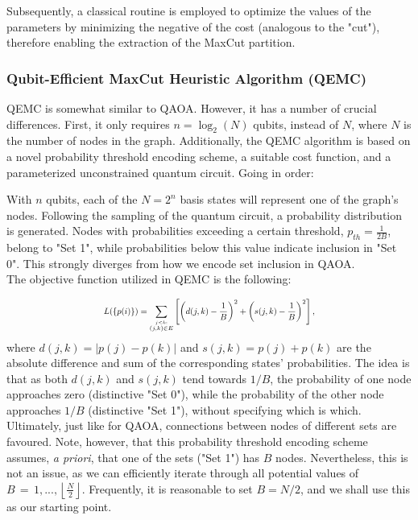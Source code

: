 Subsequently, a classical routine is employed to optimize the values of the parameters by minimizing the negative of the cost (analogous to the "cut"), therefore enabling the extraction of the MaxCut partition.

\subsubsection{Qubit-Efficient MaxCut Heuristic Algorithm (QEMC)}
\label{sec: QEMC}

QEMC \cite{tenecohen2023variational} is somewhat similar to QAOA. However, it has a number of crucial differences. First, it only requires $n = \log_2(N)$ qubits, instead of $N$, where $N$ is the number of nodes in the graph. Additionally, the QEMC algorithm is based on a novel probability threshold encoding scheme, a suitable cost function, and a parameterized unconstrained quantum circuit. Going in order:

 With $n$ qubits, each of the $N = 2^{n}$ basis states will represent one of the graph's nodes. Following the sampling of the quantum circuit, a probability distribution is generated. Nodes with probabilities exceeding a certain threshold, $p_{th} = \frac{1}{2B}$, belong to "Set 1", while probabilities below this value indicate inclusion in "Set 0". This strongly diverges from how we encode set inclusion in QAOA. \\

 The objective function utilized in QEMC is the following:

\begin{equation}
    \scalebox{0.75}{$\displaystyle
    L(\{p(i)\}) = \sum_{\stackrel{j < k:}{(j,k)\in E}}\left[\left(d(j,k)-\frac{1}{B}\right)^{2}+\left(s(j,k)-\frac{1}{B}\right)^{2}\right],$}
\end{equation}
where $d(j,k) = |p(j) - p(k)|$ and $s(j, k) = p(j) + p(k)$ are the absolute difference and sum of the corresponding states' probabilities. The idea is that as both $d(j, k)$ and $s(j, k)$ tend towards $1/B$, the probability of one node approaches zero (distinctive "Set 0"), while the probability of the other node approaches $1/B$ (distinctive "Set 1"), without specifying which is which. Ultimately, just like for QAOA, connections between nodes of different sets are favoured. Note, however, that this probability threshold encoding scheme assumes, \textit{a priori}, that one of the sets ("Set 1") has $B$ nodes. Nevertheless, this is not an issue, as we can efficiently iterate through all potential values of $B\,=\,1,...,\left\lfloor{\frac{N}{2}}\right\rfloor$. Frequently, it is reasonable to set $B = N/2$, and we shall use this as our starting point. \\

